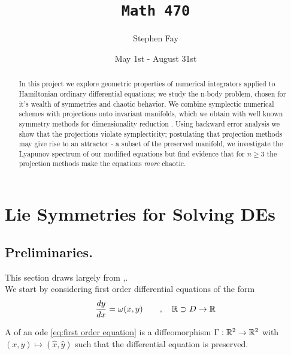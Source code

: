 \documentclass[12pt]{article}
\begin{document}
 
 
\title{\texttt{Math 470}}
\author{Stephen Fay}
\date{May 1st - August 31st}
\maketitle


\begin{abstract}
In this project we explore geometric properties of numerical integrators applied to Hamiltonian ordinary differential equations; we study the n-body problem, chosen for it's wealth of symmetries and chaotic behavior. We combine symplectic numerical schemes \cite{Numerical} with projections onto invariant manifolds, which we obtain with well known symmetry methods for dimensionality reduction \cite{Symmetry-methods}. Using backward error analysis we show that the projections violate symplecticity; postulating that projection methods may give rise to an attractor - a subset of the preserved manifold, we investigate the Lyapunov spectrum of our modified equations but find evidence that for $n\geq 3$ the projection methods make the equations \textit{more} chaotic. 
\end{abstract}

\tableofcontents

\section{Lie Symmetries for Solving DEs}

\subsection{Preliminaries.}

This section draws largely from \cite{R-Steinhour},\cite{Symmetry-methods}.\\ We start by considering first order differential equations of the form
\begin{equation}\label{eq:first order equation}
    \frac{dy}{dx} = \omega(x,y)\qquad,\quad \mathbb{R} \supset D \to \mathbb{R}
\end{equation}

A  of an ode \eqref{eq:first order equation} is a diffeomorphism $\Gamma : \mathbb{R}^2\to\mathbb{R}^2$ with $(x,y)\mapsto (\hat x,\hat y)$ such that the differential equation is preserved.
\end{document}
